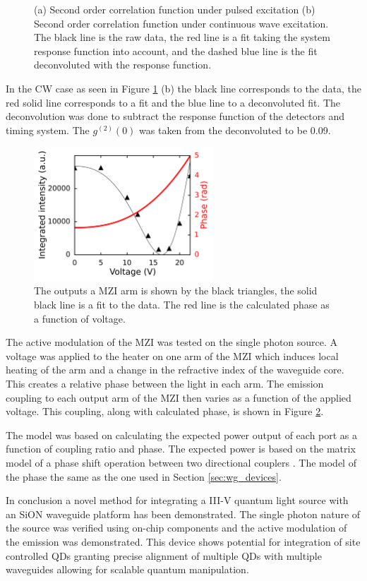 \begin{figure}[h!]
\begin{subfigure}{0.49\textwidth}
\end{subfigure} \caption{(a) Second order correlation function under pulsed
excitation (b) Second order correlation function under continuous wave
excitation. The black line is the raw data, the red line is a fit taking the
system response function into account, and the dashed blue line is the fit
deconvoluted with the response function.} \label{fig:g2s} \end{figure}

In the CW case as seen in Figure \ref{fig:g2s} (b) the black line corresponds to
the data, the red solid line corresponds to a fit and the blue line to a
deconvoluted fit. The deconvolution was done to subtract the response function
of the detectors and timing system. The $g^{(2)}(0)$ was taken from the
deconvoluted to be 0.09.

\begin{figure}[h!] \centering
\includegraphics[width=0.6\textwidth]{images/dj_oneport.png} \caption{The
outputs a MZI arm is shown by the black triangles, the solid black line is a fit
to the data. The red line is the calculated phase as a function of voltage.}
\label{fig:modul} \end{figure}

The active modulation of the MZI was tested on the single photon source. A
voltage was applied to the heater on one arm of the MZI which induces local
heating of the arm and a change in the refractive index of the waveguide core.
This creates a relative phase between the light in each arm. The emission
coupling to each output arm of the MZI then varies as a function of the applied
voltage. This coupling, along with calculated phase, is shown in Figure
\ref{fig:modul}.

The model was based on calculating the expected power output of each port as a
function of coupling ratio and phase. The expected power is based on the matrix
model of a phase shift operation between two directional couplers
\cite{jones1941new}. The model of the phase the same as the one used in Section
\ref{sec:wg_devices}\cite{matthews2009manipulation}.

In conclusion a novel method for integrating a III-V quantum light source with
an SiON waveguide platform has been demonstrated. The single photon nature of
the source was verified using on-chip components and the active modulation of
the emission was demonstrated. This device shows potential for integration of
site controlled \cite{juska2013towards} QDs granting precise alignment of
multiple QDs with multiple waveguides allowing for scalable quantum
manipulation.
